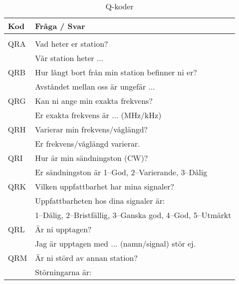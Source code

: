 \begin{longtable}{ll}
	\textbf{Kod} & \textbf{Fråga / Svar}                                                \\ \hline
	\endhead
	\caption{Q-koder}                                                                   \\
\endlastfoot                                                                        
	QRA          & Vad heter er station?                                                \\
                     & Vår station heter ...                                                \\ \hline
	QRB          & Hur långt bort från min station befinner ni er?                      \\
                     & Avståndet mellan oss är ungefär ...                                  \\ \hline
	QRG          & Kan ni ange min exakta frekvens?                                     \\
                     & Er exakta frekvens är ... (MHz/kHz)                                  \\ \hline
	QRH          & Varierar min frekvens/våglängd?                                      \\
                     & Er frekvens/våglängd varierar.                                       \\ \hline
	QRI          & Hur är min sändningston (CW)?                                        \\
                     & Er sändningston är 1--God, 2--Varierande, 3--Dålig                   \\ \hline
	QRK          & Vilken uppfattbarhet har mina signaler?                              \\
                     & Uppfattbarheten hos dina signaler är:                                \\
                     & 1--Dålig, 2--Bristfällig, 3--Ganska god, 4--God, 5--Utmärkt          \\ \hline
	QRL          & Är ni upptagen?                                                      \\
                     & Jag är upptagen med ... (namn/signal) stör ej.                       \\ \hline
	QRM          & Är ni störd av annan station?                                        \\
                     & Störningarna är:                                                     \\

\end{longtable}
